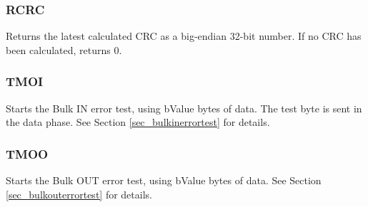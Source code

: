 \documentclass[a4paper]{book}
\begin{document}
\subsubsection{RCRC}

Returns the latest calculated CRC as a big-endian 32-bit number.  If no CRC has been calculated, returns 0.

\subsubsection{TMOI}

Starts the Bulk IN error test, using bValue bytes of data.  The test byte is sent in the data phase.  See Section \ref{sec_bulkinerrortest} for details.

\subsubsection{TMOO}

Starts the Bulk OUT error test, using bValue bytes of data.  See Section \ref{sec_bulkouterrortest} for details.
 
\end{document}
